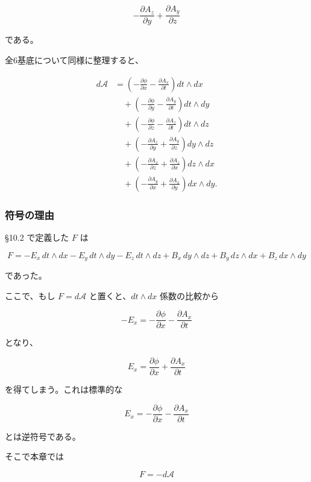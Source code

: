 \documentclass[a4paper,12pt,openany]{book}
\begin{document}
\[
-\frac{\partial A_z}{\partial y}
+
\frac{\partial A_y}{\partial z}
\]

である。

全6基底について同様に整理すると、

\[
\begin{aligned}
d\mathcal{A}
&=
\left(
-\frac{\partial\phi}{\partial x}
-
\frac{\partial A_x}{\partial t}
\right)
dt\wedge dx
\\[0.5em]
&\quad+
\left(
-\frac{\partial\phi}{\partial y}
-
\frac{\partial A_y}{\partial t}
\right)
dt\wedge dy
\\[0.5em]
&\quad+
\left(
-\frac{\partial\phi}{\partial z}
-
\frac{\partial A_z}{\partial t}
\right)
dt\wedge dz
\\[0.5em]
&\quad+
\left(
-\frac{\partial A_z}{\partial y}
+
\frac{\partial A_y}{\partial z}
\right)
dy\wedge dz
\\[0.5em]
&\quad+
\left(
-\frac{\partial A_x}{\partial z}
+
\frac{\partial A_z}{\partial x}
\right)
dz\wedge dx
\\[0.5em]
&\quad+
\left(
-\frac{\partial A_y}{\partial x}
+
\frac{\partial A_x}{\partial y}
\right)
dx\wedge dy.
\end{aligned}
\]

\hypertarget{ux7b26ux53f7ux306eux7406ux7531}{%
\subsubsection{符号の理由}\label{ux7b26ux53f7ux306eux7406ux7531}}

§10.2 で定義した \(F\) は

\[
F
=
-E_x\,dt\wedge dx
-
E_y\,dt\wedge dy
-
E_z\,dt\wedge dz
+
B_x\,dy\wedge dz
+
B_y\,dz\wedge dx
+
B_z\,dx\wedge dy
\]

であった。

ここで、もし \(F=d\mathcal{A}\) と置くと、\(dt\wedge dx\) 係数の比較から

\[
-E_x
=
-\frac{\partial\phi}{\partial x}
-
\frac{\partial A_x}{\partial t}
\]

となり、

\[
E_x
=
\frac{\partial\phi}{\partial x}
+
\frac{\partial A_x}{\partial t}
\]

を得てしまう。これは標準的な

\[
E_x
=
-\frac{\partial\phi}{\partial x}
-
\frac{\partial A_x}{\partial t}
\]

とは逆符号である。

そこで本章では

\[
F=-d\mathcal{A}
\]
\end{document}
